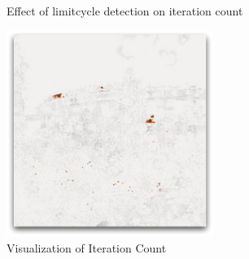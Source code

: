 \begin{figure}[ht]
\centering
{}%
%
%

\caption{Effect of limitcycle detection on iteration count}
\label{fig:limitcycle}
\end{figure}


\begin{figure}[ht]
\centering
\includegraphics[width=0.6\textwidth]{gfx/itr_limitcycle0.pdf}
\caption{Visualization of Iteration Count}
\label{fig:vis_iteration_count}
\end{figure}

